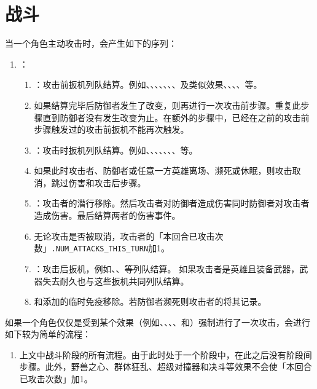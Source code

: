 \section{战斗}
\label{combat}

当一个角色主动攻击时，会产生如下的序列：
\begin{enumerate}
    \item {}：
    \begin{enumerate}
        \item {}：攻击前扳机列队结算。例如、、、、、、、及类似效果、、、、等。
        \item 如果结算完毕后防御者发生了改变，则再进行一次攻击前步骤。重复此步骤直到防御者没有发生改变为止。在额外的步骤中，已经在之前的攻击前步骤触发过的攻击前扳机不能再次触发。
        \item {}：攻击时扳机列队结算。例如、、、、、、、等。
        \item 如果此时攻击者、防御者或任意一方英雄离场、濒死或休眠，则攻击取消，跳过伤害和攻击后步骤。
        \item {}：攻击者的潜行移除。然后攻击者对防御者造成伤害同时防御者对攻击者造成伤害。最后结算两者的伤害事件。
        \item 无论攻击是否被取消，攻击者的「本回合已攻击次数」\texttt{.NUM\_ATTACKS\_THIS\_\allowbreak{}TURN}加1。
        \item {}：攻击后扳机，例如、、等列队结算。
            \notice 如果攻击者是英雄且装备武器，武器失去耐久也与这些扳机共同列队结算。
        \item {}和添加的临时免疫移除。若防御者濒死则攻击者的将其记录。
    \end{enumerate}
\end{enumerate}

如果一个角色仅仅是受到某个效果（例如、、、、和）强制进行了一次攻击，会进行如下较为简单的流程：
\begin{enumerate}
    \item  上文中战斗阶段的所有流程。由于此时处于一个阶段中，在此之后没有阶段间步骤。此外，野兽之心、群体狂乱、超级对撞器和决斗等效果不会使「本回合已攻击次数」加1。
\end{enumerate}

